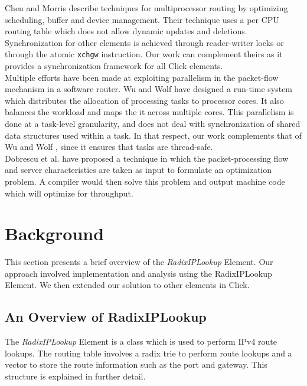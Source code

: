 \documentclass[a4paper]{article}
\begin{document}
Chen and Morris \cite{chenmorris} describe techniques for multiprocessor routing by optimizing scheduling, buffer and device management. Their technique uses a per CPU routing table which does not allow dynamic updates and deletions. Synchronization for other elements is achieved through reader-writer locks or through the atomic \texttt{xchgw} instruction. Our work can complement theirs as it provides a synchronization framework for all Click elements.\\

Multiple efforts have been made at exploiting parallelism in the packet-flow mechanism in a software router. Wu and Wolf \cite{runtimepacketprocessing} have designed a run-time system which distributes the allocation of processing tasks to processor cores. It also balances the workload and maps the it across multiple cores. This parallelism is done at a task-level granularity, and does not deal with synchronization of shared data structures used within a task. In that respect, our work complements that of Wu and Wolf \cite{runtimepacketprocessing}, since it ensures that tasks are thread-safe.\\ 


Dobrescu et al. \cite{dobrescu} have proposed a technique in which the packet-processing flow and server characteristics are taken as input to formulate an optimization problem. A compiler would then solve this problem and output machine code which will optimize for throughput.
\section{Background}
\label{sec:background}
This section presents a brief overview of the \emph{RadixIPLookup} Element. Our approach involved implementation and analysis using the RadixIPLookup Element. We then extended our solution to other elements in Click. 
\subsection{An Overview of RadixIPLookup}
The \emph{RadixIPLookup} Element \cite{radixiplookup} is a class which is used to perform IPv4 route lookups. The routing table involves a radix trie to perform route lookups and a vector to store the route information such as the port and gateway. This structure is explained in further detail. 
\end{document}

